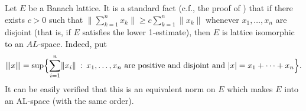\documentclass[12pt]{amsart}
\makeatletter
\theoremstyle{plain}
\theoremstyle{definition}
\newcommand{\abs}[1]{\lvert#1\rvert}
\newcommand{\norm}[1]{\lVert#1\rVert}
\newcommand{\bignorm}[1]{\bigl\lVert#1\bigr\rVert}
\renewcommand{\le}{\leqslant}
\renewcommand{\ge}{\geqslant}
\renewcommand{\mid}{\::\:}
\def\@tvsp{\mathchoice{{}\mkern-4.5mu}{{}\mkern-4.5mu}{{}\mkern-2.5mu}{}}
\def\ltrivert{\left|\@tvsp\left|\@tvsp\left|}
\def\rtrivert{\right|\@tvsp\right|\@tvsp\right|}
\newcommand{\trinorm}[1]{\ltrivert#1\rtrivert}
\newcommand{\bigtrinorm}[1]{\ltrivert\phantom{\bigl|}\!#1\!\phantom{\bigr|}\rtrivert}
\makeatother
\begin{document}
\medskip

Let $E$ be a Banach lattice. It is a standard fact (c.f., the proof of
\cite[Lemma~1.b.13]{Lindenstrauss:79}) that if there exists $c>0$ such
that
\begin{math}
    \bignorm{\sum_{k=1}^nx_k}\ge c\sum_{k=1}^n\norm{x_k}
\end{math}
whenever $x_1,\dots,x_n$ are disjoint (that is, if $E$ satisfies the
lower 1-estimate), then $E$ is lattice isomorphic to an $AL$-space.
Indeed, put
\begin{displaymath}
    \trinorm{x}
    =\sup\Bigl\{\sum_{i=1}^n\norm{x_i}\mid
    x_1,\dots,x_n\text{ are positive and disjoint and }\abs{x}=x_1+\dots+x_n\Bigr\}.
\end{displaymath}
It can be easily verified that this is an equivalent norm on $E$ which
makes $E$ into an AL-space (with the same order).


\end{document}
